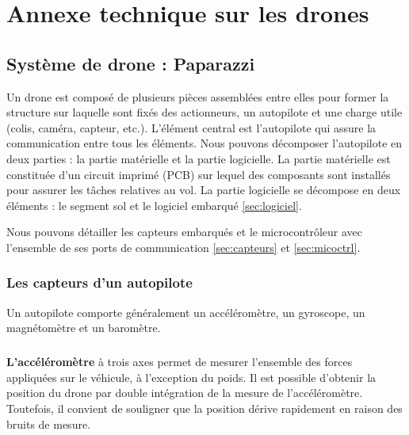 \chapter*{Annexe technique sur les drones}
\label{chap:annexe1}

\renewcommand{\thefigure}{A.\arabic{figure}}
\setcounter{figure}{0} %

\renewcommand{\thetable}{A.\arabic{table}}
\setcounter{table}{0} %

\section*{Système de drone : Paparazzi}

Un drone est composé de plusieurs pièces assemblées entre elles pour former la structure sur laquelle sont fixés des actionneurs, un autopilote et une charge utile (colis, caméra, capteur, etc.). L'élément central est l'autopilote qui assure la communication entre tous les éléments. Nous pouvons décomposer l'autopilote en deux parties : la partie matérielle et la partie logicielle.
La partie matérielle est constituée d'un circuit imprimé (PCB) sur lequel des composants sont installés pour assurer les tâches relatives au vol. La partie logicielle se décompose en deux éléments : le segment sol et le logiciel embarqué \ref{sec:logiciel}.

Nous pouvons détailler les capteurs embarqués et le microcontrôleur avec l'ensemble de ses ports de communication \ref{sec:capteurs} et \ref{sec:micoctrl}. 

 \subsection*{Les capteurs d'un autopilote}
 \label{sec:capteurs}
 Un autopilote comporte généralement un accéléromètre, un gyroscope, un magnétomètre et un baromètre.
 
 \paragraph*{}
 \textbf{L'accéléromètre} à trois axes permet de mesurer l'ensemble des forces appliquées sur le véhicule, à l'exception du poids. Il est possible d'obtenir la position du drone par double intégration de la mesure de l'accéléromètre. Toutefois, il convient de souligner que la position dérive rapidement en raison des bruits de mesure.


